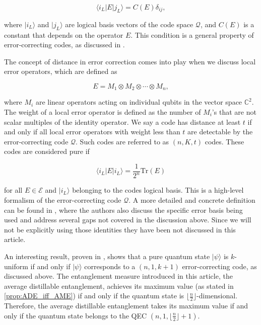 \documentclass{article}
\newcommand{\ket}[1]{|#1\rangle}
\newcommand{\bra}[1]{\langle #1|}
\begin{document}
\begin{equation}
\bra{i_L}E\ket{j_L} = C(E) \delta_{ij},
\end{equation}


where $\ket{i_L}$ and $\ket{j_L}$ are logical basis vectors of the code space $\mathcal{Q}$, and $C(E)$ is a constant that depends on the operator $E$. This condition is a general property of error-correcting codes, as discussed in \cite{Nielsen_Chuang_2010}. 

The concept of distance in error correction comes into play when we discuss local error operators, which are defined as

\begin{equation}
E = M_1 \otimes M_2 \otimes \cdots \otimes M_n,
\end{equation}


where $M_i$ are linear operators acting on individual qubits in the vector space $\mathbb{C}^2$. The weight of a local error operator is defined as the number of $M_i$'s that are not scalar multiples of the identity operator. We say a code has distance at least $t$ if and only if all local error operators with weight less than $t$ are detectable by the error-correcting code $\mathcal{Q}$. Such codes are referred to as $(n, K, t)$ codes. These codes are considered pure if 

\begin{equation}
\bra{i_L}E\ket{i_L} = \frac{1}{2^n} \text{Tr}(E)
\end{equation}

for all $E \in \mathcal{E}$ and $\ket{i_L}$ belonging to the codes logical basis.
This is a high-level formalism of the error-correcting code $\mathcal{Q}$. A more detailed and concrete definition can be found in \cite{Scott_k-uniform}, where the authors also discuss the specific error basis being used and address several gaps not covered in the discussion above. Since we will not be explicitly using those identities they have been not discussed in this article.

An interesting result, proven in \cite{Scott_k-uniform}, shows that a pure quantum state $\ket{\psi}$ is $k$-uniform if and only if $\ket{\psi}$ corresponds to a $(n, 1, k+1)$ error-correcting code, as discussed above. The entanglement measure introduced in this article, the average distillable entanglement, achieves its maximum value (as stated in \ref{prop:ADE_iff_AME}) if and only if the quantum state is $\lfloor \frac{n}{2} \rfloor$-dimensional. Therefore, the average distillable entanglement takes its maximum value if and only if the quantum state belongs to the QEC $(n, 1, \lfloor \frac{n}{2} \rfloor+1)$.
\end{document}
